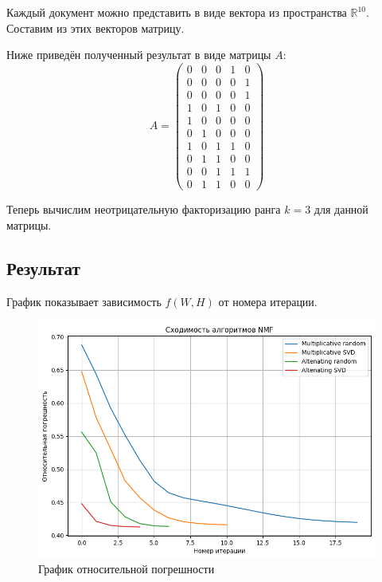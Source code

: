 Каждый документ можно представить в виде вектора из пространства $\mathbb{R}^{10}$.
Составим из этих векторов матрицу.

\newpage

Ниже приведён полученный результат в виде матрицы $A$:
\begin{equation*}
A =
\begin{pmatrix}
0 & 0 & 0 & 1 & 0 \\
0 & 0 & 0 & 0 & 1 \\
0 & 0 & 0 & 0 & 1 \\
1 & 0 & 1 & 0 & 0 \\
1 & 0 & 0 & 0 & 0 \\
0 & 1 & 0 & 0 & 0 \\
1 & 0 & 1 & 1 & 0 \\
0 & 1 & 1 & 0 & 0 \\
0 & 0 & 1 & 1 & 1 \\
0 & 1 & 1 & 0 & 0
\end{pmatrix}
\end{equation*}

Теперь вычислим неотрицательную факторизацию ранга $k=3$ для данной матрицы.


\subsection{Результат}

График показывает зависимость $f(W, H)$ от номера итерации.

\begin{figure}[h]
  \includegraphics[width=\linewidth]{assets/Graph1.png}
  \caption{График относительной погрешности}
  \label{fig:relativeApproximationError}
\end{figure}

